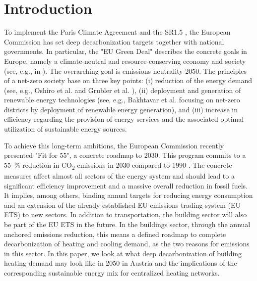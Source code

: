 \section{Introduction}
To implement the Paris Climate Agreement \cite{agreement2015paris} and the SR1.5 \cite{edenhofer2011ipcc}, the European Commission has set deep decarbonization targets together with national governments. In particular, the "EU Green Deal" describes the concrete goals in Europe, namely a climate-neutral and resource-conserving economy and society (see, e.g., in \cite{kemfert2019green}). The overarching goal is emissions neutrality 2050. The principles of a net-zero society base on three key points: (i) reduction of the energy demand (see, e.g., Oshiro et al. \cite{oshiro2021enabling} and Grubler et al. \cite{grubler2018low}), (ii) deployment and generation of renewable energy technologies (see, e.g., Bakhtavar et al. \cite{bakhtavar2020assessment} focusing on net-zero districts by deployment of renewable energy generation), and (iii) increase in efficiency regarding the provision of energy services and the associated optimal utilization of sustainable energy sources.\vspace{0.3cm}

To achieve this long-term ambitions, the European Commission recently presented "Fit for 55", a concrete roadmap to 2030. This program commits to a \SI{55}{\%} reduction in CO\textsubscript{2} emissions in 2030 compared to 1990 \cite{european_commission_european_2019}. The concrete measures affect almost all sectors of the energy system and should lead to a significant efficiency improvement and a massive overall reduction in fossil fuels. It implies, among others, binding annual targets for reducing energy consumption and an extension of the already established EU emissions trading system (EU ETS) to new sectors. In addition to transportation, the building sector will also be part of the EU ETS in the future. In the buildings sector, through the annual anchored emissions reduction, this means a defined roadmap to complete decarbonization of heating and cooling demand, as the two reasons for emissions in this sector. In this paper, we look at what deep decarbonization of building heating demand may look like in 2050 in Austria and the implications of the corresponding sustainable energy mix for centralized heating networks.

